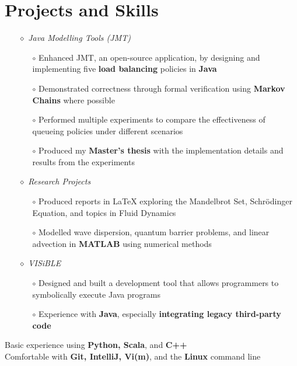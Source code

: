 \documentclass[a4paper]{article}
\begin{document}
\vspace{-10pt}
\section*{Projects and Skills}
\vspace{-7pt}

\begin{itemize}
\item[$\diamond$] \textit{Java Modelling Tools (JMT)}
\begin{itemize}
\item[$\circ$] Enhanced JMT, an open-source application, by designing and implementing five \textbf{load balancing} policies in \textbf{Java}
\item[$\circ$] Demonstrated correctness through formal verification using \textbf{Markov Chains} where possible
\item[$\circ$] Performed multiple experiments to compare the effectiveness of queueing policies under different scenarios
\item[$\circ$] Produced my \textbf{Master's thesis} with the implementation details and results from the experiments
\end{itemize}

\item[$\diamond$] \textit{Research Projects}
\begin{itemize}
\item[$\circ$] Produced reports in {\LaTeX} exploring the Mandelbrot Set, Schr\"odinger Equation, and topics in Fluid Dynamics
\item[$\circ$] Modelled wave dispersion, quantum barrier problems, and linear advection in \textbf{MATLAB} using numerical methods
\end{itemize}

\item[$\diamond$] \textit{VISiBLE}
\begin{itemize}
\item[$\circ$] Designed and built a development tool that allows programmers to symbolically execute Java programs
\item[$\circ$] Experience with \textbf{Java}, especially \textbf{integrating legacy third-party code}
\end{itemize}

\end{itemize}

\noindent Basic experience using \textbf{Python, Scala}, and \textbf{C++} \\
\noindent Comfortable with \textbf{Git, IntelliJ, Vi(m)}, and the \textbf{Linux} command line
\end{document}

